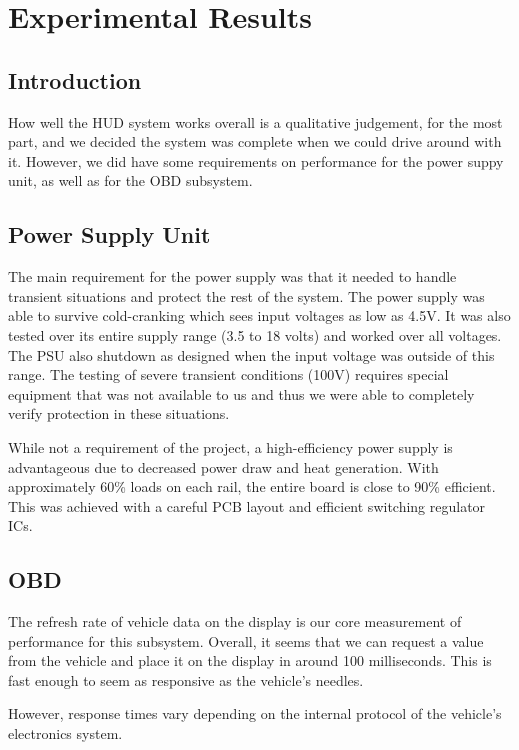 \chapter{Experimental Results}


\section{Introduction}

How well the HUD system works overall is a qualitative judgement, for the most
part, and we decided the system was complete when we could drive around with it.
However, we did have some requirements on performance for the power suppy unit, as well
as for the OBD subsystem.

\section{Power Supply Unit}

The main requirement for the power supply was that it needed to handle transient 
situations and protect the rest of the system.  The power supply was able to survive
cold-cranking which sees input voltages as low as 4.5V.  It was also tested
over its entire supply range (3.5 to 18 volts) and worked over all voltages.  The PSU
also shutdown as designed when the input voltage was outside of this range.  The 
testing of severe transient conditions (\pm 100V) requires special equipment that was
not available to us and thus we were able to completely verify protection in these
situations.

While not a requirement of the project, a high-efficiency power supply is advantageous 
due to decreased power draw and heat generation.  With approximately 60\% loads on 
each rail, the entire board is close to 90\% efficient.  This was achieved with a 
careful PCB layout and efficient switching regulator ICs.

\section{OBD}

The refresh rate of vehicle data on the display is our core measurement of
performance for this subsystem. Overall, it seems that we can request a value
from the vehicle and place it on the display in around 100 milliseconds. This
is fast enough to seem as responsive as the vehicle's needles.

However, response times vary depending on the internal protocol of the vehicle's
electronics system.

